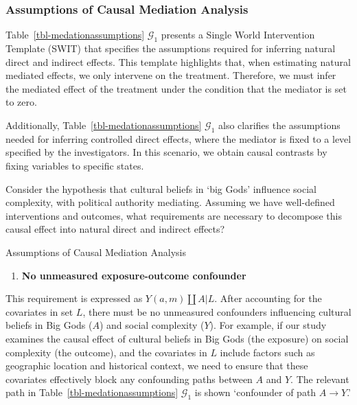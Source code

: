 \documentclass[
  single column]{article}
\providecommand{\tightlist}{%
  \setlength{\itemsep}{0pt}\setlength{\parskip}{0pt}}\usepackage{longtable,booktabs,array}
\begin{document}
\subsubsection{Assumptions of Causal Mediation
Analysis}\label{assumptions-of-causal-mediation-analysis}

Table~\ref{tbl-medationassumptions} \(\mathcal{G}_1\) presents a Single
World Intervention Template (SWIT) that specifies the assumptions
required for inferring natural direct and indirect effects. This
template highlights that, when estimating natural mediated effects, we
only intervene on the treatment. Therefore, we must infer the mediated
effect of the treatment under the condition that the mediator is set to
zero.

Additionally, Table~\ref{tbl-medationassumptions} \(\mathcal{G}_1\) also
clarifies the assumptions needed for inferring controlled direct
effects, where the mediator is fixed to a level specified by the
investigators. In this scenario, we obtain causal contrasts by fixing
variables to specific states.

Consider the hypothesis that cultural beliefs in `big Gods' influence
social complexity, with political authority mediating. Assuming we have
well-defined interventions and outcomes, what requirements are necessary
to decompose this causal effect into natural direct and indirect
effects?

\begin{table}

\caption{\label{tbl-medationassumptions}Assumptions of Causal Mediation
Analysis}

\centering{

\mediationassumptionsswig

}

\end{table}%

\begin{enumerate}
\def\labelenumi{\arabic{enumi}.}
\tightlist
\item
  \textbf{No unmeasured exposure-outcome confounder}
\end{enumerate}

This requirement is expressed as \(Y(a,m) \coprod A | L\). After
accounting for the covariates in set \(L\), there must be no unmeasured
confounders influencing cultural beliefs in Big Gods (\(A\)) and social
complexity (\(Y\)). For example, if our study examines the causal effect
of cultural beliefs in Big Gods (the exposure) on social complexity (the
outcome), and the covariates in \(L\) include factors such as geographic
location and historical context, we need to ensure that these covariates
effectively block any confounding paths between \(A\) and \(Y\). The
relevant path in Table~\ref{tbl-medationassumptions} \(\mathcal{G}_1\)
is shown `confounder of path \(A \to Y\).'
\end{document}
